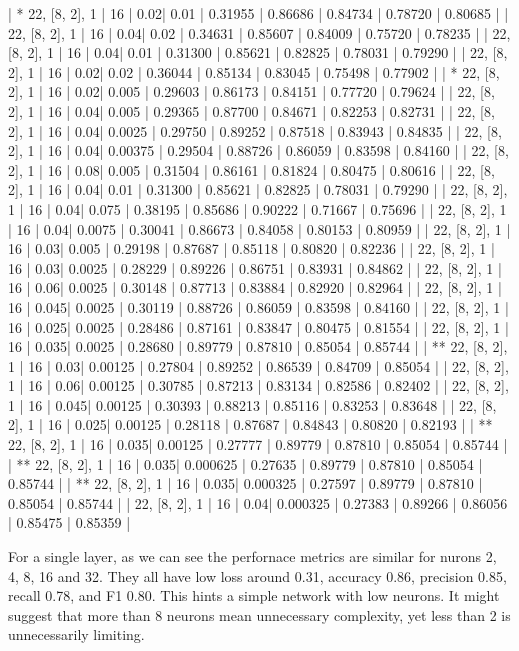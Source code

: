 | * 22, [8, 2], 1 | 16 | 0.02| 0.01 | 0.31955 | 0.86686 | 0.84734 | 0.78720 | 0.80685 |
| 22, [8, 2], 1 | 16 | 0.04| 0.02 | 0.34631 | 0.85607 | 0.84009 | 0.75720 | 0.78235 |
| 22, [8, 2], 1 | 16 | 0.04| 0.01 | 0.31300 | 0.85621 | 0.82825 | 0.78031 | 0.79290 |
| 22, [8, 2], 1 | 16 | 0.02| 0.02 | 0.36044 | 0.85134 | 0.83045 | 0.75498 | 0.77902 |
| * 22, [8, 2], 1 | 16 | 0.02| 0.005 | 0.29603 | 0.86173 | 0.84151 | 0.77720 | 0.79624 |
| 22, [8, 2], 1 | 16 | 0.04| 0.005 | 0.29365 | 0.87700 | 0.84671 | 0.82253 | 0.82731 |
| 22, [8, 2], 1 | 16 | 0.04| 0.0025 | 0.29750 | 0.89252 | 0.87518 | 0.83943 | 0.84835 |
| 22, [8, 2], 1 | 16 | 0.04| 0.00375 | 0.29504 | 0.88726 | 0.86059 | 0.83598 | 0.84160 |
| 22, [8, 2], 1 | 16 | 0.08| 0.005 | 0.31504 | 0.86161 | 0.81824 | 0.80475 | 0.80616 |
| 22, [8, 2], 1 | 16 | 0.04| 0.01 | 0.31300 | 0.85621 | 0.82825 | 0.78031 | 0.79290 |
| 22, [8, 2], 1 | 16 | 0.04| 0.075 | 0.38195 | 0.85686 | 0.90222 | 0.71667 | 0.75696 |
| 22, [8, 2], 1 | 16 | 0.04| 0.0075 | 0.30041 | 0.86673 | 0.84058 | 0.80153 | 0.80959 |
| 22, [8, 2], 1 | 16 | 0.03| 0.005 | 0.29198 | 0.87687 | 0.85118 | 0.80820 | 0.82236 |
| 22, [8, 2], 1 | 16 | 0.03| 0.0025 | 0.28229 | 0.89226 | 0.86751 | 0.83931 | 0.84862 |
| 22, [8, 2], 1 | 16 | 0.06| 0.0025 | 0.30148 | 0.87713 | 0.83884 | 0.82920 | 0.82964 |
| 22, [8, 2], 1 | 16 | 0.045| 0.0025 | 0.30119 | 0.88726 | 0.86059 | 0.83598 | 0.84160 |
| 22, [8, 2], 1 | 16 | 0.025| 0.0025 | 0.28486 | 0.87161 | 0.83847 | 0.80475 | 0.81554 |
| 22, [8, 2], 1 | 16 | 0.035| 0.0025 | 0.28680 | 0.89779 | 0.87810 | 0.85054 | 0.85744 |
| ** 22, [8, 2], 1 | 16 | 0.03| 0.00125 | 0.27804 | 0.89252 | 0.86539 | 0.84709 | 0.85054 |
| 22, [8, 2], 1 | 16 | 0.06| 0.00125 | 0.30785 | 0.87213 | 0.83134 | 0.82586 | 0.82402 |
| 22, [8, 2], 1 | 16 | 0.045| 0.00125 | 0.30393 | 0.88213 | 0.85116 | 0.83253 | 0.83648 |
| 22, [8, 2], 1 | 16 | 0.025| 0.00125 | 0.28118 | 0.87687 | 0.84843 | 0.80820 | 0.82193 |
| ** 22, [8, 2], 1 | 16 | 0.035| 0.00125 | 0.27777 | 0.89779 | 0.87810 | 0.85054 | 0.85744 |
| ** 22, [8, 2], 1 | 16 | 0.035| 0.000625 | 0.27635 | 0.89779 | 0.87810 | 0.85054 | 0.85744 |
| ** 22, [8, 2], 1 | 16 | 0.035| 0.000325 | 0.27597 | 0.89779 | 0.87810 | 0.85054 | 0.85744 |
| 22, [8, 2], 1 | 16 | 0.04| 0.000325 | 0.27383 | 0.89266 | 0.86056 | 0.85475 | 0.85359 |

For a single layer, as we can see the perfornace metrics are similar for nurons 2, 4, 8, 16 and 32. They all have low loss around 0.31, accuracy 0.86, precision 0.85, recall 0.78, and F1 0.80.  This hints a simple network with low neurons. It might suggest that more than 8 neurons mean unnecessary complexity, yet less than 2 is unnecessarily limiting.


